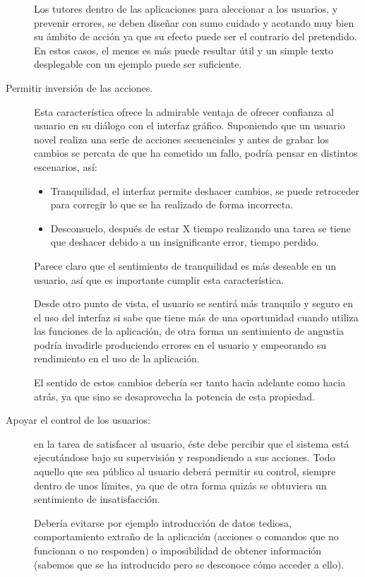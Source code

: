 \begin{description}
Los tutores dentro de las aplicaciones para aleccionar a los usuarios, y prevenir errores, 
se deben diseñar con sumo cuidado y acotando muy bien su ámbito de acción ya 
que su efecto puede ser el contrario del pretendido. En estos casos, el menos es más puede 
resultar útil y un simple texto desplegable con un ejemplo puede ser suficiente.


\item[Permitir inversión de las acciones.] Esta característica ofrece la
admirable ventaja de ofrecer confianza al usuario en su diálogo con el interfaz gráfico. 
Suponiendo que un usuario novel realiza una serie de acciones secuenciales y antes de grabar 
los cambios se percata de que ha cometido un fallo, podría pensar en distintos escenarios, así:
\begin{itemize}
\item Tranquilidad, el interfaz permite deshacer cambios, se puede retroceder para corregir lo que se ha realizado de forma incorrecta.
\item Desconsuelo, después de estar X tiempo realizando una tarea se tiene que deshacer debido a un insignificante error, tiempo perdido.
\end{itemize}

Parece claro que el sentimiento de tranquilidad es más deseable en un usuario, así que es 
importante cumplir esta característica.

Desde otro punto de vista, el usuario se sentirá más tranquilo y seguro en el uso del interfaz 
si sabe que tiene más de una oportunidad cuando utiliza las funciones de la aplicación, 
de otra forma un sentimiento de angustia podría invadirle produciendo errores en el usuario y 
empeorando su rendimiento en el uso de la aplicación.

El sentido de estos cambios debería ser tanto hacia adelante como hacia atrás, ya que sino se desaprovecha 
la potencia de esta propiedad.

\item[Apoyar el control de los usuarios:] en la tarea de satisfacer al usuario,
éste debe percibir que el sistema está ejecutándose bajo su supervisión y respondiendo a sus acciones. 
Todo aquello que sea público al usuario deberá permitir su control, siempre dentro de unos límites, 
ya que de otra forma quizás se obtuviera un sentimiento de insatisfacción.

Debería evitarse por ejemplo introducción de datos tediosa, comportamiento extraño de la aplicación 
(acciones o comandos que no funcionan o no responden) o imposibilidad de obtener información 
(sabemos que se ha introducido pero se desconoce cómo acceder a ello).


\end{description}
